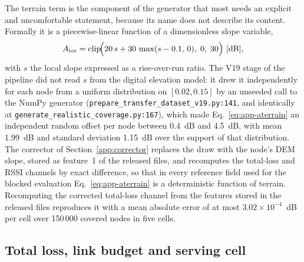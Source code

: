 The terrain term is the component of the generator that most needs an
explicit and uncomfortable statement, because its name does not describe
its content. Formally it is a piecewise-linear function of a dimensionless
slope variable,
\begin{equation}
A_{\mathrm{ter}} = \operatorname{clip}\!\Bigl(
20\,s + 30\,\max(s-0.1,\,0),\; 0,\; 30 \Bigr)\ [\mathrm{dB}] ,
\label{eq:app-aterrain}
\end{equation}
with $s$ the local slope expressed as a rise-over-run ratio. The V19 stage
of the pipeline did not read $s$ from the digital elevation model: it drew
it independently for each node from a uniform distribution on $[0.02, 0.15]$
by an unseeded call to the NumPy generator
(\texttt{prepare\_\allowbreak{}transfer\_\allowbreak{}dataset\_\allowbreak{}v19.py:\allowbreak{}141}, and identically at
\texttt{generate\_\allowbreak{}realistic\_\allowbreak{}coverage\allowbreak{}.py:\allowbreak{}167}), which made
Eq.~\eqref{eq:app-aterrain} an independent random offset per node between
0.4~dB and 4.5~dB, with mean 1.99~dB and standard deviation 1.15~dB over the
support of that distribution. The corrector of Section~\ref{app:corrector}
replaces the draw with the node's DEM slope, stored as feature~1 of the
released files, and recomputes the total-loss and RSSI channels by exact
difference, so that in every reference field used for the blocked evaluation
Eq.~\eqref{eq:app-aterrain} is a deterministic function of terrain.
Recomputing the corrected total-loss channel from the features stored in the
released files reproduces it with a mean absolute error of at most
$3.02 \times 10^{-4}$~dB per cell over 150\,000 covered nodes in five cells.

\subsection{Total loss, link budget and serving cell}

